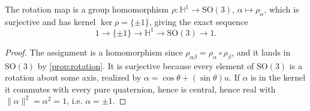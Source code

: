 \begin{corollary}
    \label{cor:cover}
    \leanok
    The rotation map is a group homomorphism
    $\rho \colon \mathbb{H}^1 \to \mathrm{SO}(3)$, $\alpha \mapsto \rho_\alpha$,
    which is surjective and has kernel $\ker\rho = \{\pm 1\}$, giving the exact
    sequence
    \[
      1 \to \{\pm 1\} \to \mathbb{H}^1 \to \mathrm{SO}(3) \to 1.
    \]
\end{corollary}
\begin{proof}
    The assignment is a homomorphism since
    $\rho_{\alpha\beta} = \rho_\alpha \circ \rho_\beta$, and it lands in
    $\mathrm{SO}(3)$ by \ref{prop:rotation}. It is surjective because every element
    of $\mathrm{SO}(3)$ is a rotation about some axis, realized by
    $\alpha = \cos\theta + (\sin\theta)u$. If $\alpha$ is in the kernel it commutes
    with every pure quaternion, hence is central, hence real with
    $\lVert\alpha\rVert^2 = \alpha^2 = 1$, i.e. $\alpha = \pm 1$.
\end{proof}


